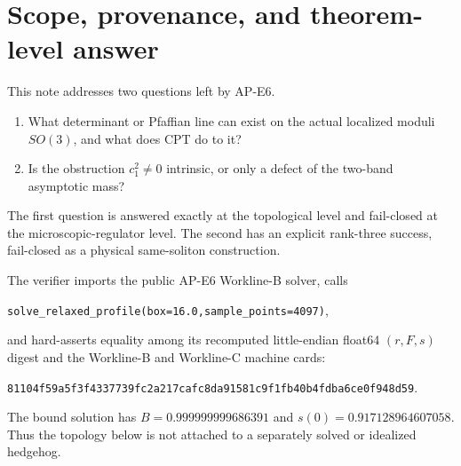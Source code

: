 \documentclass[11pt]{article}
\theoremstyle{definition}
\theoremstyle{remark}
\begin{document}
\tableofcontents

\section{Scope, provenance, and theorem-level answer}

This note addresses two questions left by AP-E6.
\begin{enumerate}[label=(\roman*)]
\item What determinant or Pfaffian line can exist on the actual localized
  moduli \(SO(3)\), and what does CPT do to it?
\item Is the obstruction \(c_1^2\ne0\) intrinsic, or only a defect of the
  two-band asymptotic mass?
\end{enumerate}
The first question is answered exactly at the topological level and
fail-closed at the microscopic-regulator level.  The second has an explicit
rank-three success, fail-closed as a physical same-soliton construction.

The verifier imports the public AP-E6 Workline-B solver, calls
\begin{center}
\small
\nolinkurl{solve_relaxed_profile(box=16.0,sample_points=4097)},
\end{center}
and hard-asserts equality among its recomputed little-endian float64
\((r,F,s)\) digest and the Workline-B and Workline-C machine cards:
\begin{center}
\small
\nolinkurl{81104f59a5f3f4337739fc2a217cafc8da91581c9f1fb40b4fdba6ce0f948d59}.
\end{center}
The bound solution has
\(B=0.999999999686391\) and \(s(0)=0.917128964607058\).  Thus the topology
below is not attached to a separately solved or idealized hedgehog.
\end{document}
